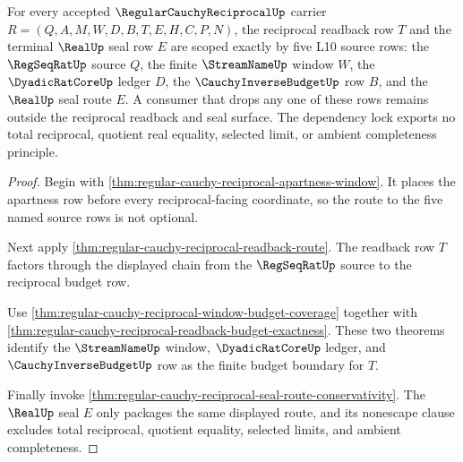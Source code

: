 \begin{theorem}
\label{thm:regular-cauchy-reciprocal-scope-dependency-lock}
For every accepted $\RegularCauchyReciprocalUp$ carrier $R=(Q,A,M,W,D,B,T,E,H,C,P,N)$, the reciprocal readback row $T$ and the terminal $\RealUp$ seal row $E$ are scoped exactly by five L10 source rows: the $\RegSeqRatUp$ source $Q$, the finite $\StreamNameUp$ window $W$, the $\DyadicRatCoreUp$ ledger $D$, the $\CauchyInverseBudgetUp$ row $B$, and the $\RealUp$ seal route $E$. A consumer that drops any one of these rows remains outside the reciprocal readback and seal surface. The dependency lock exports no total reciprocal, quotient real equality, selected limit, or ambient completeness principle.
\end{theorem}
\begin{proof}
Begin with \autoref{thm:regular-cauchy-reciprocal-apartness-window}. It places the apartness row before every reciprocal-facing coordinate, so the route to the five named source rows is not optional.

Next apply \autoref{thm:regular-cauchy-reciprocal-readback-route}. The readback row $T$ factors through the displayed chain from the $\RegSeqRatUp$ source to the reciprocal budget row.

Use \autoref{thm:regular-cauchy-reciprocal-window-budget-coverage} together with \autoref{thm:regular-cauchy-reciprocal-readback-budget-exactness}. These two theorems identify the $\StreamNameUp$ window, $\DyadicRatCoreUp$ ledger, and $\CauchyInverseBudgetUp$ row as the finite budget boundary for $T$.

Finally invoke \autoref{thm:regular-cauchy-reciprocal-seal-route-conservativity}. The $\RealUp$ seal $E$ only packages the same displayed route, and its nonescape clause excludes total reciprocal, quotient equality, selected limits, and ambient completeness.
\end{proof}



